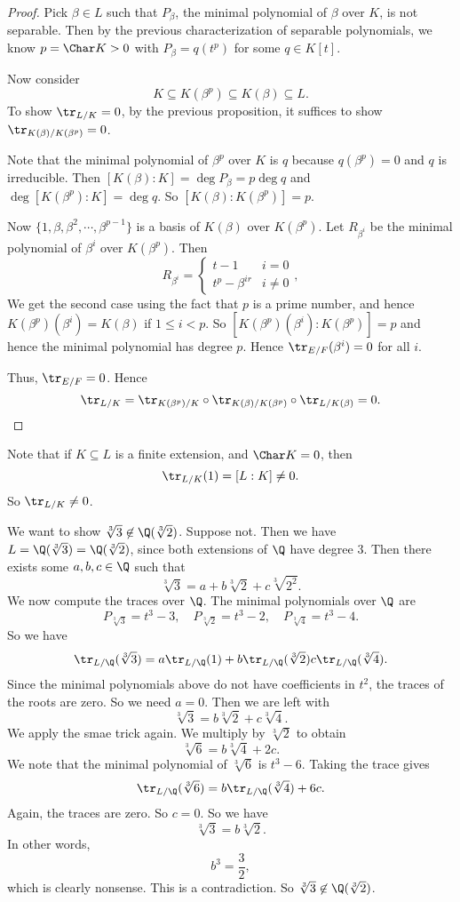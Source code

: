 \documentclass[a4paper]{article}
\begin{document}
\begin{proof}
  Pick $\beta \in L$ such that $P_\beta$, the minimal polynomial of $\beta$ over $K$, is not separable. Then by the previous characterization of separable polynomials, we know $p = \Char K > 0$ with $P_\beta = q(t^p)$ for some $q \in K[t]$.

  Now consider
  \[
    K \subseteq K(\beta^p) \subseteq K(\beta) \subseteq L.
  \]
  To show $\tr_{L/K} = 0$, by the previous proposition, it suffices to show $\tr_{K(\beta)/K(\beta^p)} = 0$.

  Note that the minimal polynomial of $\beta^p$ over $K$ is $q$ because $q(\beta^p) = 0$ and $q$ is irreducible. Then $[K(\beta):K] = \deg P_\beta = p \deg q$ and $\deg[K(\beta^p):K] = \deg q$. So $[K(\beta):K(\beta^p)] = p$.

  Now $\{1, \beta, \beta^2, \cdots, \beta^{p - 1}\}$ is a basis of $K(\beta)$ over $K(\beta^p)$. Let $R_{\beta^i}$ be the minimal polynomial of $\beta^i$ over $K(\beta^p)$. Then
  \[
    R_{\beta^i} =
    \begin{cases}
      t - 1 & i = 0\\
      t^p - \beta^{ir} & i \not=0
    \end{cases},
  \]
  We get the second case using the fact that $p$ is a prime number, and hence $K(\beta^p)(\beta^i) = K(\beta)$ if $1 \leq i < p$. So $[K(\beta^p)(\beta^i):K(\beta^p)] = p$ and hence the minimal polynomial has degree $p$. Hence $\tr_{E/F} (\beta^i) = 0$ for all $i$.

  Thus, $\tr_{E/F} = 0$. Hence
  \[
    \tr_{L/K} = \tr_{K(\beta^p)/K} \circ \tr_{K(\beta)/K(\beta^p)} \circ \tr_{L/K(\beta)} = 0.
  \]
\end{proof}
Note that if $K \subseteq L$ is a finite extension, and $\Char K = 0$, then
\[
  \tr_{L/K}(1) = [L:K] \not= 0.
\]
So $\tr_{L/K} \not= 0$.

\begin{eg}
  We want to show $\sqrt[3]{3} \not\in \Q(\sqrt[3]{2})$. Suppose not. Then we have $L = \Q(\sqrt[3]{3}) = \Q(\sqrt[3]{2})$, since both extensions of $\Q$ have degree $3$. Then there exists some $a, b, c \in \Q$ such that
  \[
    \sqrt[3]{3} = a + b\sqrt[3]{2} + c \sqrt[3]{2^2}.
  \]
  We now compute the traces over $\Q$. The minimal polynomials over $\Q$ are
  \[
    P_{\sqrt[3]{3}} = t^3 - 3,\quad P_{\sqrt[3]{2}} = t^3 - 2,\quad P_{\sqrt[3]{4}} = t^3 - 4.
  \]
  So we have
  \[
    \tr_{L/\Q}(\sqrt[3]{3}) = a \tr_{L/\Q}(1) + b \tr_{L/\Q}(\sqrt[3]{2}) c\tr_{L/\Q}(\sqrt[3]{4}).
  \]
  Since the minimal polynomials above do not have coefficients in $t^2$, the traces of the roots are zero. So we need $a = 0$. Then we are left with
  \[
    \sqrt[3]{3} = b\sqrt[3]{2} + c\sqrt[3]{4}.
  \]
  We apply the smae trick again. We multiply by $\sqrt[3]{2}$ to obtain
  \[
    \sqrt[3]{6} = b\sqrt[3]{4} + 2c.
  \]
  We note that the minimal polynomial of $\sqrt[3]{6}$ is $t^3 - 6$. Taking the trace gives
  \[
    \tr_{L/\Q}(\sqrt[3]{6}) = b \tr_{L/\Q}(\sqrt[3]{4}) + 6c.
  \]
  Again, the traces are zero. So $c = 0$. So we have
  \[
    \sqrt[3]{3} = b \sqrt[3]{2}.
  \]
  In other words,
  \[
    b^3 = \frac{3}{2},
  \]
  which is clearly nonsense. This is a contradiction. So $\sqrt[3]{3} \not\in \Q(\sqrt[3]{2})$.
\end{eg}
\end{document}
